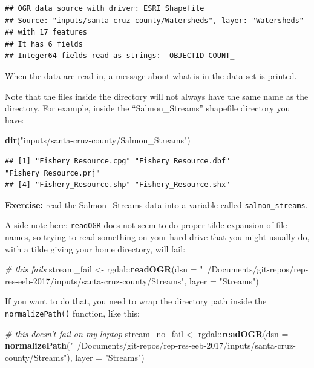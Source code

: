 \documentclass[]{book}
\newenvironment{Shaded}{\begin{snugshade}}{\end{snugshade}}
\newcommand{\KeywordTok}[1]{\textcolor[rgb]{0.13,0.29,0.53}{\textbf{{#1}}}}
\newcommand{\DataTypeTok}[1]{\textcolor[rgb]{0.13,0.29,0.53}{{#1}}}
\newcommand{\StringTok}[1]{\textcolor[rgb]{0.31,0.60,0.02}{{#1}}}
\newcommand{\CommentTok}[1]{\textcolor[rgb]{0.56,0.35,0.01}{\textit{{#1}}}}
\newcommand{\NormalTok}[1]{{#1}}
\theoremstyle{definition}
\theoremstyle{definition}
\theoremstyle{remark}
\begin{document}
\begin{verbatim}
## OGR data source with driver: ESRI Shapefile 
## Source: "inputs/santa-cruz-county/Watersheds", layer: "Watersheds"
## with 17 features
## It has 6 fields
## Integer64 fields read as strings:  OBJECTID COUNT_
\end{verbatim}

When the data are read in, a message about what is in the data set is
printed.

Note that the files inside the directory will not always have the same
name as the directory. For example, inside the ``Salmon\_Streams''
shapefile directory you have:

\begin{Shaded}
\begin{Highlighting}[]
\KeywordTok{dir}\NormalTok{(}\StringTok{"inputs/santa-cruz-county/Salmon_Streams"}\NormalTok{)}
\end{Highlighting}
\end{Shaded}

\begin{verbatim}
## [1] "Fishery_Resource.cpg" "Fishery_Resource.dbf" "Fishery_Resource.prj"
## [4] "Fishery_Resource.shp" "Fishery_Resource.shx"
\end{verbatim}

\textbf{Exercise:} read the Salmon\_Streams data into a variable called
\texttt{salmon\_streams}.

A side-note here: \texttt{readOGR} does not seem to do proper tilde
expansion of file names, so trying to read something on your hard drive
that you might usually do, with a tilde giving your home directory, will
fail:

\begin{Shaded}
\begin{Highlighting}[]
\CommentTok{# this fails}
\NormalTok{stream_fail <-}\StringTok{ }\NormalTok{rgdal::}\KeywordTok{readOGR}\NormalTok{(}\DataTypeTok{dsn =} \StringTok{"~/Documents/git-repos/rep-res-eeb-2017/inputs/santa-cruz-county/Streams"}\NormalTok{, }
                              \DataTypeTok{layer =} \StringTok{"Streams"}\NormalTok{)}
\end{Highlighting}
\end{Shaded}

If you want to do that, you need to wrap the directory path inside the
\texttt{normalizePath()} function, like this:

\begin{Shaded}
\begin{Highlighting}[]
\CommentTok{# this doesn't fail on my laptop}
\NormalTok{stream_no_fail <-}\StringTok{ }\NormalTok{rgdal::}\KeywordTok{readOGR}\NormalTok{(}\DataTypeTok{dsn =} \KeywordTok{normalizePath}\NormalTok{(}\StringTok{"~/Documents/git-repos/rep-res-eeb-2017/inputs/santa-cruz-county/Streams"}\NormalTok{), }
                              \DataTypeTok{layer =} \StringTok{"Streams"}\NormalTok{)}
\end{Highlighting}
\end{Shaded}
\end{document}
